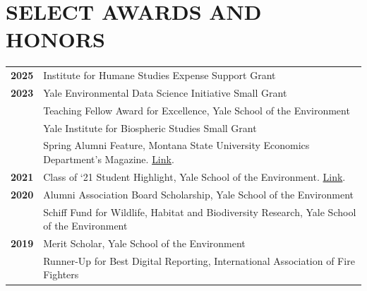 \documentclass[11pt]{article}
\begin{document}
\section*{SELECT AWARDS AND HONORS}
\begin{longtable}{>{\bfseries}r p{5.5in}}%
2025 & Institute for Humane Studies Expense Support Grant\\
2023 & Yale Environmental Data Science Initiative Small Grant \\
    & Teaching Fellow Award for Excellence, Yale School of the Environment \\
    & Yale Institute for Biospheric Studies Small Grant \\
    & Spring Alumni Feature, Montana State University Economics Department's Magazine. \href{https://www.montana.edu/econ/newsletters/Spring23NewsletterforWeb.pdf}{Link}. \\[1ex]
2021 & Class of ‘21 Student Highlight, Yale School of the Environment. \href{https://environment.yale.edu/news/article/andie-creel-putting-a-value-on-natural-resources?fbclid=IwAR1W1Rz9sNbyTzKgDEBLVM3TMJjhzOWkP5_6f4-cbtQmrNaF4BSW2MLQHGo}{Link}. \\[1ex]
2020 & Alumni Association Board Scholarship, Yale School of the Environment \\
    & Schiff Fund for Wildlife, Habitat and Biodiversity Research, Yale School of the Environment \\[1ex]
2019 & Merit Scholar, Yale School of the Environment \\
    & Runner-Up for Best Digital Reporting, International Association of Fire Fighters \\[1ex]

\end{longtable}
\end{document}

